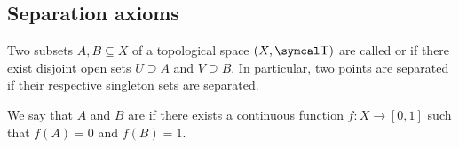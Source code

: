 \subsection{Separation axioms}\label{subsec:separation_axioms}

\begin{definition}\label{def:topological_space_separation}
  Two subsets \( A, B \subseteq X \) of a topological space \( (X, \CT) \) are called  or  if there exist disjoint open sets \( U \supseteq A \) and \( V \supseteq B \). In particular, two points are separated if their respective singleton sets are separated.

  We say that \( A \) and \( B \) are  if there exists a continuous function \( f: X \to [0, 1] \) such that \( f(A) = 0 \) and \( f(B) = 1 \).
\end{definition}

